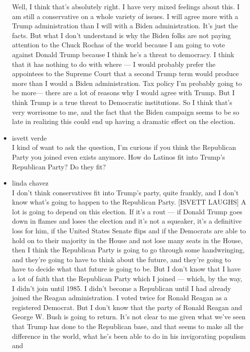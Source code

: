 \begin{itemize}
  Well, I think that's absolutely right. I have very mixed feelings
  about this. I am still a conservative on a whole variety of issues. I
  will agree more with a Trump administration than I will with a Biden
  administration. It's just the facts. But what I don't understand is
  why the Biden folks are not paying attention to the Chuck Rochas of
  the world because I am going to vote against Donald Trump because I
  think he's a threat to democracy. I think that it has nothing to do
  with where --- I would probably prefer the appointees to the Supreme
  Court that a second Trump term would produce more than I would a Biden
  administration. Tax policy I'm probably going to be more--- there are
  a lot of reasons why I would agree with Trump. But I think Trump is a
  true threat to Democratic institutions. So I think that's very
  worrisome to me, and the fact that the Biden campaign seems to be so
  late in realizing this could end up having a dramatic effect on the
  election.
\item
  isvett verde\\
  I kind of want to ask the question, I'm curious if you think the
  Republican Party you joined even exists anymore. How do Latinos fit
  into Trump's Republican Party? Do they fit?
\item
  linda chavez\\
  I don't think conservatives fit into Trump's party, quite frankly, and
  I don't know what's going to happen to the Republican Party. {[}ISVETT
  LAUGHS{]} A lot is going to depend on this election. If it's a rout
  --- if Donald Trump goes down in flames and loses the election and
  it's not a squeaker, it's a definitive loss for him, if the United
  States Senate flips and if the Democrats are able to hold on to their
  majority in the House and not lose many seats in the House, then I
  think the Republican Party is going to go through some handwringing,
  and they're going to have to think about the future, and they're going
  to have to decide what that future is going to be. But I don't know
  that I have a lot of faith that the Republican Party which I joined
  --- which, by the way, I didn't join until 1985. I didn't become a
  Republican until I had already joined the Reagan administration. I
  voted twice for Ronald Reagan as a registered Democrat. But I don't
  know that the party of Ronald Reagan and George W. Bush is going to
  return. It's not clear to me given what we've seen that Trump has done
  to the Republican base, and that seems to make all the difference in
  the world, what he's been able to do in his invigorating populism and

\end{itemize}
